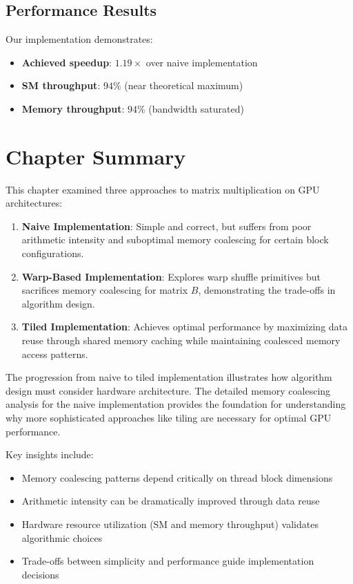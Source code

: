 \documentclass{amsbook}
\theoremstyle{definition}
\begin{document}
\subsection{Performance Results}

Our implementation demonstrates:
\begin{itemize}
\item \textbf{Achieved speedup}: $1.19\times$ over naive implementation
\item \textbf{SM throughput}: $94\%$ (near theoretical maximum)
\item \textbf{Memory throughput}: $94\%$ (bandwidth saturated)
\end{itemize}

\section{Chapter Summary}

This chapter examined three approaches to matrix multiplication on GPU architectures:

\begin{enumerate}
\item \textbf{Naive Implementation}: Simple and correct, but suffers from poor arithmetic intensity and suboptimal memory coalescing for certain block configurations.

\item \textbf{Warp-Based Implementation}: Explores warp shuffle primitives but sacrifices memory coalescing for matrix $B$, demonstrating the trade-offs in algorithm design.

\item \textbf{Tiled Implementation}: Achieves optimal performance by maximizing data reuse through shared memory caching while maintaining coalesced memory access patterns.
\end{enumerate}

The progression from naive to tiled implementation illustrates how algorithm design must consider hardware architecture. The detailed memory coalescing analysis for the naive implementation provides the foundation for understanding why more sophisticated approaches like tiling are necessary for optimal GPU performance.

Key insights include:
\begin{itemize}
\item Memory coalescing patterns depend critically on thread block dimensions
\item Arithmetic intensity can be dramatically improved through data reuse
\item Hardware resource utilization (SM and memory throughput) validates algorithmic choices
\item Trade-offs between simplicity and performance guide implementation decisions
\end{itemize}

\end{document}
